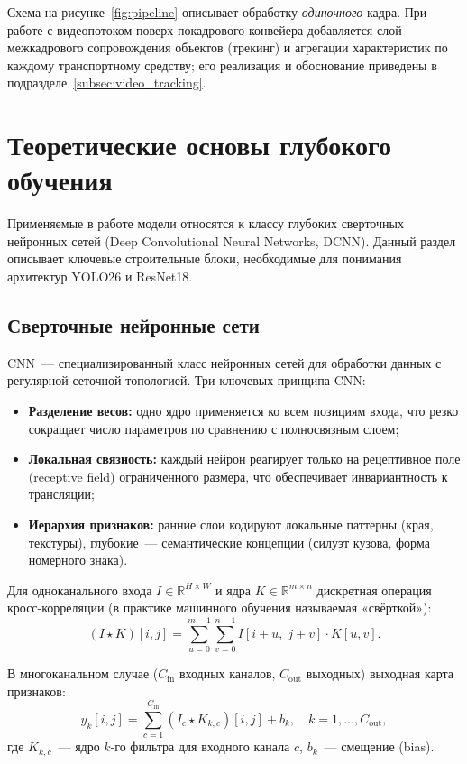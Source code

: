 \documentclass[10pt,a4paper]{report}
\numberwithin{equation}{chapter}
\numberwithin{figure}{chapter}
\numberwithin{table}{chapter}
\begin{document}
Схема на рисунке~\ref{fig:pipeline} описывает обработку \emph{одиночного}
кадра. При работе с видеопотоком поверх покадрового конвейера добавляется
слой межкадрового сопровождения объектов (трекинг) и агрегации
характеристик по каждому транспортному средству; его реализация и
обоснование приведены в подразделе~\ref{subsec:video_tracking}.

\section{Теоретические основы глубокого обучения}

Применяемые в работе модели относятся к классу глубоких сверточных
нейронных сетей (Deep Convolutional Neural Networks, DCNN).
Данный раздел описывает ключевые строительные блоки, необходимые
для понимания архитектур YOLO26 и ResNet18.

\subsection{Сверточные нейронные сети}

CNN~--- специализированный класс нейронных сетей для обработки
данных с регулярной сеточной топологией. Три ключевых принципа CNN:
\begin{itemize}
  \item \textbf{Разделение весов:} одно ядро применяется ко всем
    позициям входа, что резко сокращает число параметров по
    сравнению с полносвязным слоем;
  \item \textbf{Локальная связность:} каждый нейрон реагирует
    только на рецептивное поле (receptive field) ограниченного
    размера, что обеспечивает инвариантность к трансляции;
  \item \textbf{Иерархия признаков:} ранние слои кодируют
    локальные паттерны (края, текстуры), глубокие~---
    семантические концепции (силуэт кузова, форма номерного знака).
\end{itemize}

Для одноканального входа $I \in \mathbb{R}^{H \times W}$ и ядра
$K \in \mathbb{R}^{m \times n}$ дискретная операция кросс-корреляции
(в практике машинного обучения называемая «свёрткой»):
\begin{equation}
  (I \star K)[i,j] = \sum_{u=0}^{m-1}\sum_{v=0}^{n-1}
    I[i+u,\; j+v]\cdot K[u,v].
\end{equation}

В многоканальном случае ($C_{\mathrm{in}}$ входных каналов,
$C_{\mathrm{out}}$ выходных) выходная карта признаков:
\begin{equation}
  y_k[i,j] = \sum_{c=1}^{C_{\mathrm{in}}}
    (I_c \star K_{k,c})[i,j] + b_k,
  \quad k = 1,\ldots,C_{\mathrm{out}},
\end{equation}
где $K_{k,c}$~--- ядро $k$-го фильтра для входного канала $c$,
$b_k$~--- смещение (bias).
\end{document}
